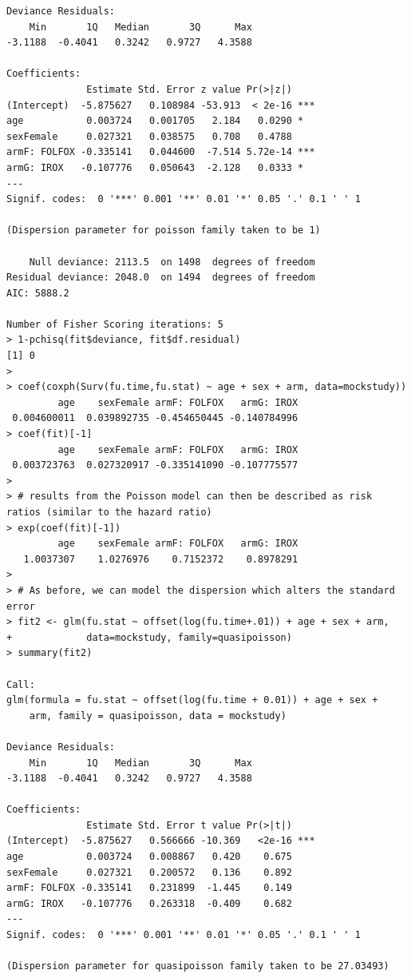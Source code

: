\documentclass[
]{book}
\begin{document}
\begin{verbatim}
Deviance Residuals: 
    Min       1Q   Median       3Q      Max  
-3.1188  -0.4041   0.3242   0.9727   4.3588  

Coefficients:
              Estimate Std. Error z value Pr(>|z|)    
(Intercept)  -5.875627   0.108984 -53.913  < 2e-16 ***
age           0.003724   0.001705   2.184   0.0290 *  
sexFemale     0.027321   0.038575   0.708   0.4788    
armF: FOLFOX -0.335141   0.044600  -7.514 5.72e-14 ***
armG: IROX   -0.107776   0.050643  -2.128   0.0333 *  
---
Signif. codes:  0 '***' 0.001 '**' 0.01 '*' 0.05 '.' 0.1 ' ' 1

(Dispersion parameter for poisson family taken to be 1)

    Null deviance: 2113.5  on 1498  degrees of freedom
Residual deviance: 2048.0  on 1494  degrees of freedom
AIC: 5888.2

Number of Fisher Scoring iterations: 5
> 1-pchisq(fit$deviance, fit$df.residual)
[1] 0
> 
> coef(coxph(Surv(fu.time,fu.stat) ~ age + sex + arm, data=mockstudy))
         age    sexFemale armF: FOLFOX   armG: IROX 
 0.004600011  0.039892735 -0.454650445 -0.140784996 
> coef(fit)[-1]
         age    sexFemale armF: FOLFOX   armG: IROX 
 0.003723763  0.027320917 -0.335141090 -0.107775577 
> 
> # results from the Poisson model can then be described as risk ratios (similar to the hazard ratio)
> exp(coef(fit)[-1])
         age    sexFemale armF: FOLFOX   armG: IROX 
   1.0037307    1.0276976    0.7152372    0.8978291 
> 
> # As before, we can model the dispersion which alters the standard error
> fit2 <- glm(fu.stat ~ offset(log(fu.time+.01)) + age + sex + arm, 
+             data=mockstudy, family=quasipoisson)
> summary(fit2)

Call:
glm(formula = fu.stat ~ offset(log(fu.time + 0.01)) + age + sex + 
    arm, family = quasipoisson, data = mockstudy)

Deviance Residuals: 
    Min       1Q   Median       3Q      Max  
-3.1188  -0.4041   0.3242   0.9727   4.3588  

Coefficients:
              Estimate Std. Error t value Pr(>|t|)    
(Intercept)  -5.875627   0.566666 -10.369   <2e-16 ***
age           0.003724   0.008867   0.420    0.675    
sexFemale     0.027321   0.200572   0.136    0.892    
armF: FOLFOX -0.335141   0.231899  -1.445    0.149    
armG: IROX   -0.107776   0.263318  -0.409    0.682    
---
Signif. codes:  0 '***' 0.001 '**' 0.01 '*' 0.05 '.' 0.1 ' ' 1

(Dispersion parameter for quasipoisson family taken to be 27.03493)


\end{verbatim}
\end{document}
